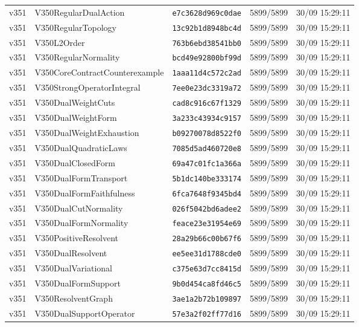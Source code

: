 \documentclass[11pt]{article}
\theoremstyle{definition}\newtheorem{deriv}{Derivação}
\begin{document}
{\begin{longtable}{@{}lllll@{}}
v351 & V350RegularDualAction & \texttt{e7c3628d969c0dae} & 5899/5899 & 30/09 15:29:11 \\
v351 & V350RegularTopology & \texttt{13c92b1d8948bc4d} & 5899/5899 & 30/09 15:29:11 \\
v351 & V350L2Order & \texttt{763b6ebd38541bb0} & 5899/5899 & 30/09 15:29:11 \\
v351 & V350RegularNormality & \texttt{bcd49e92800bf99d} & 5899/5899 & 30/09 15:29:11 \\
v351 & V350CoreContractCounterexample & \texttt{1aaa11d4c572c2ad} & 5899/5899 & 30/09 15:29:11 \\
v351 & V350StrongOperatorIntegral & \texttt{7ee0e23dc3319a72} & 5899/5899 & 30/09 15:29:11 \\
v351 & V350DualWeightCuts & \texttt{cad8c916c67f1329} & 5899/5899 & 30/09 15:29:11 \\
v351 & V350DualWeightForm & \texttt{3a233c43934c9157} & 5899/5899 & 30/09 15:29:11 \\
v351 & V350DualWeightExhaustion & \texttt{b09270078d8522f0} & 5899/5899 & 30/09 15:29:11 \\
v351 & V350DualQuadraticLaws & \texttt{7085d5ad460720e8} & 5899/5899 & 30/09 15:29:11 \\
v351 & V350DualClosedForm & \texttt{69a47c01fc1a366a} & 5899/5899 & 30/09 15:29:11 \\
v351 & V350DualFormTransport & \texttt{5b1dc140be333174} & 5899/5899 & 30/09 15:29:11 \\
v351 & V350DualFormFaithfulness & \texttt{6fca7648f9345bd4} & 5899/5899 & 30/09 15:29:11 \\
v351 & V350DualCutNormality & \texttt{026f5042bd6adee2} & 5899/5899 & 30/09 15:29:11 \\
v351 & V350DualFormNormality & \texttt{feace23e31954e69} & 5899/5899 & 30/09 15:29:11 \\
v351 & V350PositiveResolvent & \texttt{28a29b66c00b67f6} & 5899/5899 & 30/09 15:29:11 \\
v351 & V350DualResolvent & \texttt{ee5ee31d1788cde0} & 5899/5899 & 30/09 15:29:11 \\
v351 & V350DualVariational & \texttt{c375e63d7cc8415d} & 5899/5899 & 30/09 15:29:11 \\
v351 & V350DualFormSupport & \texttt{9b0d454ca8fd46c5} & 5899/5899 & 30/09 15:29:11 \\
v351 & V350ResolventGraph & \texttt{3ae1a2b72b109897} & 5899/5899 & 30/09 15:29:11 \\
v351 & V350DualSupportOperator & \texttt{57e3a2f02ff77d16} & 5899/5899 & 30/09 15:29:11 \\

\end{longtable}}
\end{document}
